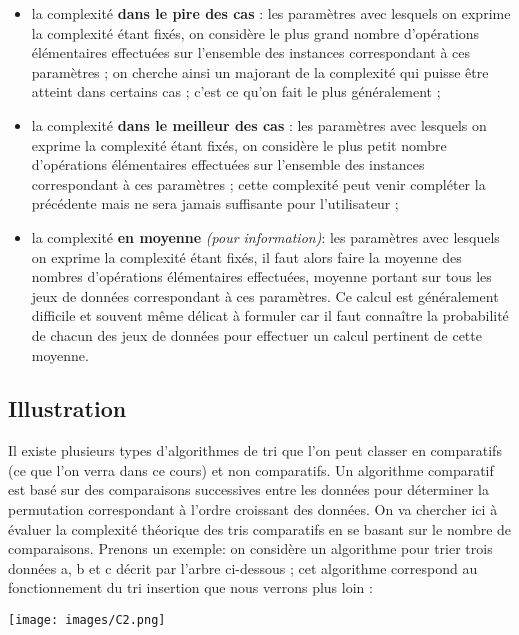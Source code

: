 \documentclass[t,11pt]{article}
\begin{document}
\begin{itemize}
\item la complexité \textbf{dans le pire des cas} : les paramètres avec lesquels on exprime la
complexité étant fixés, on considère le plus grand nombre d’opérations
élémentaires effectuées sur l’ensemble des instances correspondant à ces
paramètres ; on cherche ainsi un majorant de la complexité qui puisse être atteint
dans certains cas ; c’est ce qu’on fait le plus généralement ;
\item la complexité \textbf{dans le meilleur des cas} : les paramètres avec lesquels on exprime la
complexité étant fixés, on considère le plus petit nombre d’opérations élémentaires
effectuées sur l’ensemble des instances correspondant à ces paramètres ; cette
complexité peut venir compléter la précédente mais ne sera jamais suffisante pour
l’utilisateur ;
\item la complexité \textbf{en moyenne} \textit{(pour information)}: les paramètres avec lesquels on exprime la complexité
étant fixés, il faut alors faire la moyenne des nombres d’opérations élémentaires effectuées, moyenne portant sur tous les jeux de données correspondant à ces paramètres. Ce calcul est généralement difficile et souvent même délicat à
formuler car il faut connaître la probabilité de chacun des jeux de données pour effectuer un calcul pertinent de cette moyenne.
\end{itemize}

\subsection{Illustration}
\noindent
Il existe plusieurs types d'algorithmes de tri que l'on peut classer en comparatifs (ce que l'on verra dans ce cours) et non comparatifs.
Un algorithme comparatif est basé sur des comparaisons successives entre les données pour déterminer la permutation correspondant à l'ordre croissant des données.
On va chercher ici à évaluer la complexité théorique des tris comparatifs en se basant sur le nombre de comparaisons.
\noindent
Prenons un exemple:
on considère un algorithme pour
trier trois données a, b et c décrit par l’arbre ci-dessous ; cet algorithme correspond au fonctionnement du tri insertion que nous verrons plus loin :
\begin{center}
\texttt{[image: images/C2.png]}
\end{center}
\end{document}
